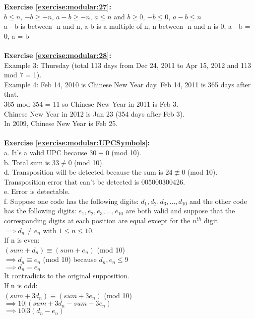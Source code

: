\textbf{Exercise \ref{exercise:modular:27}:}\\
$b \le n$, $-b \ge -n$, $a-b \ge -n$, $a \le n$ and $b \ge 0$, $-b \le 0$, $a-b \le n$\\
a - b is between -n and n, a-b is a multiple of n, n between -n and n is 0, a - b = 0, a = b\\
\\
\textbf{Exercise \ref{exercise:modular:28}:}\\
Example 3: Thursday (total 113 days from Dec 24, 2011 to Apr 15, 2012 and 113 mod 7 = 1).\\
Example 4: Feb 14, 2010 is Chinese New Year day. Feb 14, 2011 is 365 days after that.\\
365 mod 354 = 11 so Chinese New Year in 2011 is Feb 3.\\
Chinese New Year in 2012 is Jan 23 (354 days after Feb 3).\\
In 2009, Chinese New Year is Feb 25.\\
\\
\textbf{Exercise \ref{exercise:modular:UPCSymbols}:}\\
a. It's a valid UPC because $30 \equiv 0$ (mod 10).\\
b. Total sum is $33 \not\equiv 0$ (mod 10).\\
d. Transposition will be detected because the sum is $24 \not\equiv 0$ (mod 10).\\
Transposition error that can't be detected is 005000300426.\\
e. Error is detectable.\\
f. Suppose one code has the following digits: $d_1,d_2,d_3,...,d_{10}$ and the other code has the following digits: $e_1,e_2,e_3,...,e_{10}$ are both valid and suppose that the corresponding digits at each position are equal except for the $n^{th}$ digit $\implies d_n \neq e_n$ with $1 \le n \le 10$.\\
If n is even:\\
$(sum + d_n) \equiv (sum + e_n)$ (mod 10)\\
$\implies d_n \equiv e_n$ (mod 10) because $d_n, e_n \le 9$\\
$\implies d_n = e_n$\\
It contradicts to the original supposition.\\
If n is odd:\\
$(sum+3d_n) \equiv (sum+3e_n)$ (mod 10)\\
$\implies 10|(sum+3d_n-sum-3e_n)$\\
$\implies 10|3(d_n-e_n)$\\

